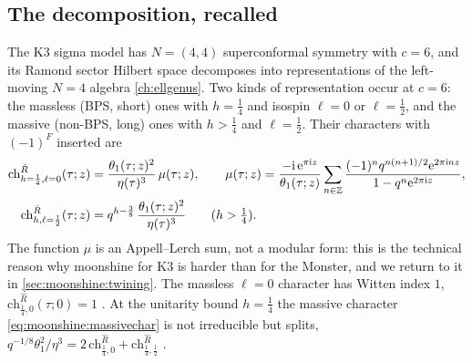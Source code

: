 \subsection{The decomposition, recalled}

The K3 sigma model has $N=(4,4)$ superconformal symmetry with $c=6$, and its Ramond
sector Hilbert space decomposes into representations of the left-moving $N=4$ algebra
\cref{ch:ellgenus}. Two kinds of representation occur at $c=6$: the massless (BPS, short)
ones with $h=\tfrac14$ and isospin $\ell=0$ or $\ell=\tfrac12$, and the massive (non-BPS,
long) ones with $h>\tfrac14$ and $\ell=\tfrac12$. Their characters with $(-1)^F$ inserted
are 
\begin{align}
  \mathrm{ch}^{\hat R}_{h=\frac14,\ell=0}(\tau;z)&=\frac{\theta_1(\tau;z)^2}{\eta(\tau)^3}\,
    \mu(\tau;z),\qquad
  \mu(\tau;z)=\frac{-\mathrm{i}\,\mathrm{e}^{\pi\mathrm{i} z}}{\theta_1(\tau;z)}\sum_{n\in\mathbb{Z}}
    \frac{(-1)^n q^{n(n+1)/2}\mathrm{e}^{2\pi\mathrm{i} nz}}{1-q^n\mathrm{e}^{2\pi\mathrm{i} z}},
    \label{eq:moonshine:masslesschar}\\
  \mathrm{ch}^{\hat R}_{h,\ell=\frac12}(\tau;z)&=q^{h-\frac38}\,
    \frac{\theta_1(\tau;z)^2}{\eta(\tau)^3}\qquad(h>\tfrac14).
    \label{eq:moonshine:massivechar}
\end{align}
The function $\mu$ is an Appell--Lerch sum, not a modular form: this is the technical
reason why moonshine for K3 is harder than for the Monster, and we return to it in
\cref{sec:moonshine:twining}. The massless $\ell=0$ character has Witten index $1$,
$\mathrm{ch}^{\hat R}_{\frac14,0}(\tau;0)=1$ . At the unitarity
bound $h=\tfrac14$ the massive character \eqref{eq:moonshine:massivechar} is not irreducible
but splits, $q^{-1/8}\theta_1^2/\eta^3=2\,\mathrm{ch}^{\hat R}_{\frac14,0}+
\mathrm{ch}^{\hat R}_{\frac14,\frac12}$ .

